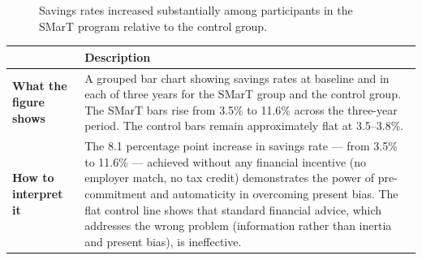\documentclass[12pt, letterpaper]{article}
\begin{document}
\begin{figure}[htbp]
\centering


\caption{Savings rates increased substantially among participants in the SMarT program relative to the control group.}
\end{figure}


\begin{table}[H]
\centering
\small
\begin{tabularx}{\linewidth}{lY}
\toprule
 & Description \\
\midrule
\textbf{What the figure shows} & A grouped bar chart showing savings rates at baseline and in each of three years for the SMarT group and the control group. The SMarT bars rise from 3.5\% to 11.6\% across the three-year period. The control bars remain approximately flat at 3.5--3.8\%. \\
\textbf{How to interpret it} & The 8.1 percentage point increase in savings rate --- from 3.5\% to 11.6\% --- achieved without any financial incentive (no employer match, no tax credit) demonstrates the power of pre-commitment and automaticity in overcoming present bias. The flat control line shows that standard financial advice, which addresses the wrong problem (information rather than inertia and present bias), is ineffective. \\
\bottomrule
\end{tabularx}
\end{table}
\end{document}

